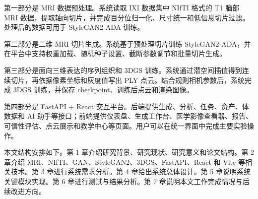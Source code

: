 第一部分是 MRI 数据预处理。系统读取 IXI 数据集中 NIfTI 格式的 T1 脑部 MRI 数据，提取轴向切片，并完成百分位归一化、尺寸统一和低信息切片过滤。处理后的数据可用于 StyleGAN2-ADA 训练。

第二部分是二维 MRI 切片生成。系统基于预处理切片训练 StyleGAN2-ADA，并在平台中支持权重加载、随机种子设置、截断参数调节和批量切片生成。

第三部分是面向三维表达的序列组织和 3DGS 训练。系统通过潜空间插值得到连续切片，再依据像素坐标和灰度值写出 PLY 点云。结合规则相机参数后，系统完成 3DGS 训练，并保存 checkpoint、训练后点云和渲染图像。

第四部分是 FastAPI + React 交互平台。后端提供生成、分析、任务、资产、体数据和 AI 助手等接口；前端提供仪表盘、生成工作台、医学影像查看器、报告、可信性评估、点云展示和教学中心等页面。用户可以在统一界面中完成主要实验操作。

本文结构安排如下。第 1 章介绍研究背景、研究现状、研究意义和论文结构。第 2 章介绍 MRI、NIfTI、GAN、StyleGAN2、3DGS、FastAPI、React 和 Vite 等相关技术。第 3 章进行系统需求分析。第 4 章给出系统总体设计。第 5 章说明系统关键模块实现。第 6 章进行测试与结果分析。第 7 章说明本文工作完成情况与后续改进方向。
